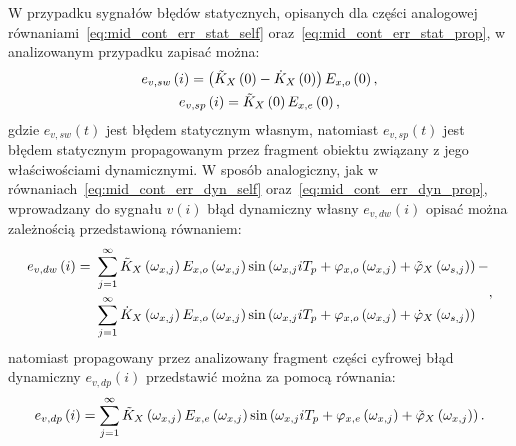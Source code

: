 W przypadku sygnałów błędów statycznych, opisanych dla części analogowej równaniami~\eqref{eq:mid_cont_err_stat_self} oraz~\eqref{eq:mid_cont_err_stat_prop}, w analizowanym przypadku zapisać można:
\begin{gather}
e_{v,sw} \left(i\right) = \left( \tilde{K}_{X} \left(0\right) - \dot{K}_{X} \left(0\right) \right) E_{x,o} \left(0\right) \label{eq:mid_disc_err_stat_self}, \\
e_{v,sp} \left(i\right) = \tilde{K}_{X} \left(0\right) E_{x,e} \left(0\right) \label{eq:mid_disc_err_stat_prop},
\end{gather}
gdzie $e_{v,sw}(t)$ jest błędem statycznym własnym, natomiast $e_{v,sp}(t)$ jest błędem statycznym propagowanym przez fragment obiektu związany z jego właściwościami dynamicznymi. W sposób analogiczny, jak w równaniach~\eqref{eq:mid_cont_err_dyn_self} oraz~\eqref{eq:mid_cont_err_dyn_prop}, wprowadzany do sygnału $v(i)$ błąd dynamiczny własny $e_{v,dw}(i)$ opisać można zależnością przedstawioną równaniem:
\begin{equation}
\begin{split}
e_{v,dw} \left(i\right) =~
& \sum _{j = 1} ^{\infty} \tilde{K}_{X} \left(\omega_{x,j}\right) E_{x,o} \left(\omega_{x,j}\right) \sin \left( \omega_{x,j} iT_{p} + \varphi_{x,o} \left(\omega_{x,j}\right) + \tilde{\varphi}_{X} \left(\omega_{s,j}\right) \right) - \\
& \sum _{j = 1} ^{\infty} \dot{K}_{X} \left(\omega_{x,j}\right) E_{x,o} \left(\omega_{x,j}\right) \sin \left( \omega_{x,j} iT_{p} + \varphi_{x,o} \left(\omega_{x,j}\right) + \dot{\varphi}_{X} \left(\omega_{s,j}\right) \right)
\end{split}
\label{eq:mid_disc_err_dyn_self},
\end{equation}
natomiast propagowany przez analizowany fragment części cyfrowej błąd dynamiczny $e_{v,dp}(i)$ przedstawić można za pomocą równania:
\begin{equation}
e_{v,dp} \left(i\right) = \sum _{j = 1} ^{\infty} \tilde{K}_{X} \left(\omega_{x,j}\right) E_{x,e} \left(\omega_{x,j}\right) \sin \left( \omega_{x,j} iT_{p} + \varphi_{x,e} \left(\omega_{x,j}\right) + \tilde{\varphi}_{X} \left(\omega_{x,j}\right) \right) \label{eq:mid_disc_err_dyn_prop}.
\end{equation}

